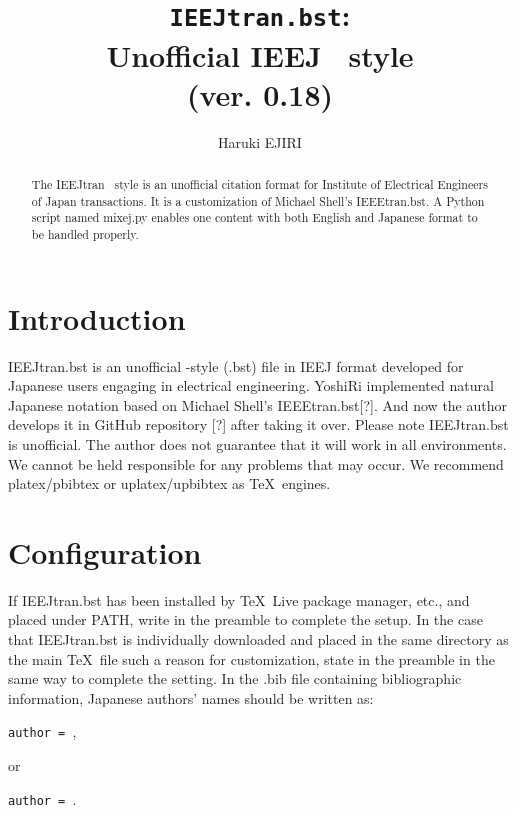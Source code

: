 \documentclass[11pt, a4paper, dvipdfmx]{article}
\title{\texttt{IEEJtran.bst}:\\Unofficial IEEJ \BibTeX\ style\\(ver. 0.18)}
\author{Haruki EJIRI}
\begin{document}
\maketitle

\begin{abstract}
The IEEJtran \BibTeX\ style is an unofficial citation format for Institute of Electrical Engineers of Japan transactions.
It is a customization of Michael Shell's IEEEtran.bst.
A Python script named mixej.py enables one content with both English and Japanese format to be handled properly.
\end{abstract}


\section{Introduction}

IEEJtran.bst is an unofficial \BibTeX-style (.bst) file in IEEJ format developed for Japanese users engaging in electrical engineering.
YoshiRi implemented natural Japanese notation based on Michael Shell's IEEEtran.bst[?].
And now the author develops it in GitHub repository [?] after taking it over.
Please note IEEJtran.bst is unofficial.
The author does not guarantee that it will work in all environments.
We cannot be held responsible for any problems that may occur.
We recommend platex/pbibtex or uplatex/upbibtex as \TeX\ engines.


\section{Configuration}

If IEEJtran.bst has been installed by \TeX\ Live package manager, etc., and placed under PATH, write \texttt{\string{}} in the preamble to complete the setup.
In the case that IEEJtran.bst is individually downloaded and placed in the same directory as the main \TeX\ file such a reason for customization, state \texttt{\string{}} in the preamble in the same way to complete the setting.
In the .bib file containing bibliographic information, Japanese authors' names should be written as:
\begin{center}
\texttt{author = },
\end{center}
or
\begin{center}
\texttt{author = }.
\end{center}
\end{document}
